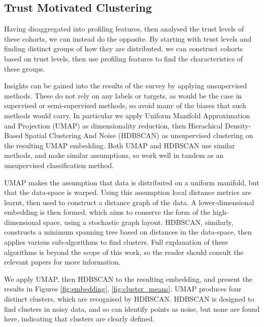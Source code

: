 \documentclass[manuscript,screen,review]{acmart}
\begin{document}
\subsection{Trust Motivated Clustering}

Having disaggregated into profiling features, then analysed the trust levels of these cohorts, we can instead do the opposite. By starting with trust levels and finding distinct groups of how they are distributed, we can construct cohorts based on trust levels, then use profiling features to find the characteristics of these groups.

Insights can be gained into the results of the survey by applying unsupervised methods. These do not rely on any labels or targets, as would be the case in supervised or semi-supervised methods, so avoid many of the biases that such methods would carry. In particular we apply Uniform Manifold Approximation and Projection (UMAP) \cite{McInnes2018} as dimensionality reduction, then Hierachical Density-Based Spatial Clustering And Noise (HDBSCAN) \cite{McInnes2017} as unsupervised clustering on the resulting UMAP embedding. Both UMAP and HDBSCAN use similar methods, and make similar assumptions, so work well in tandem as an unsupervised classification method.

UMAP makes the assumption that data is distributed on a uniform manifold, but that the data-space is warped. Using this assumption local distance metrics are learnt, then used to construct a distance graph of the data. A lower-dimensional embedding is then formed, which aims to conserve the form of the high-dimensional space, using a stochastic graph layout. HDBSCAN, similarly, constructs a minimum spanning tree based on distances in the data-space, then applies various sub-algorithms to find clusters. Full explanation of these algorithms is beyond the scope of this work, so the reader should consult the relevant papers for more information. 

We apply UMAP, then HDBSCAN to the resulting embedding, and present the results in Figures \ref{fig:embedding}, \ref{fig:cluster_means}. UMAP produces four distinct clusters, which are recognised by HDBSCAN. HDBSCAN is designed to find clusters in noisy data, and so can identify points as noise, but none are found here, indicating that clusters are clearly defined.
\end{document}

